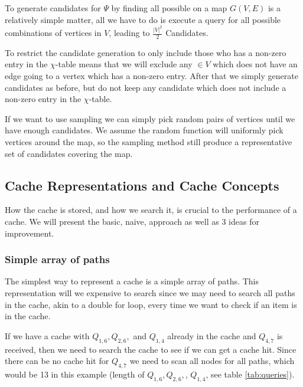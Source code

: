 

To generate \spath candidates for $\Psi$ by finding all possible \spath on a map $G(V,E)$ is a relatively simple matter, all we have to do is execute a \spath query for all possible combinations of vertices in $V$, leading to $\frac{|V|^2}{2}$ Candidates.

To restrict the candidate generation to only include those who has a non-zero entry in the $\chi$-table means that we will exclude any $ \in V$ which does not have an edge going to a vertex which has a non-zero entry. After that we simply generate candidates as before, but do not keep any candidate which does not include a non-zero entry in the $\chi$-table.

If we want to use sampling we can simply pick random pairs of vertices until we have enough candidates. We assume the random function will uniformly pick vertices around the map, so the sampling method still produce a representative set of candidates covering the map.


\subsection{Cache Representations and Cache Concepts} \label{subsec:cacherepresentatons}
How the cache is stored, and how we search it, is crucial to the performance of a cache. We will present the basic, naive, approach as well as 3 ideas for improvement.
% 
\subsubsection{Simple array of paths}%
The simplest way to represent a cache is a simple array of paths. This representation will we expensive to search since we may need to search all paths in the cache, akin to a double for loop, every time we want to check if an item is in the cache.

If we have a cache with $Q_{1,6},Q_{2,6},$ and $Q_{1,4}$ already in the cache and $Q_{4,7}$ is received, then we need to search the cache to see if we can get a cache hit. Since there can be no cache hit for $Q_{4,7}$ we need to scan all nodes for all paths, which would be 13 in this example (length of $Q_{1,6},Q_{2,6},$, $Q_{1,4}$, see table \ref{tab:queries}).

